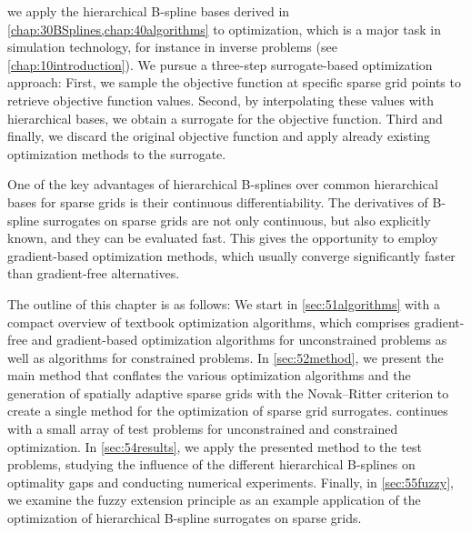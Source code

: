 
\label{chap:50optimization}

we apply the hierarchical B-spline bases derived in
\cref{chap:30BSplines,chap:40algorithms} to optimization,
which is a major task in simulation technology,
for instance in inverse problems (see \cref{chap:10introduction}).
We pursue a three-step surrogate-based optimization approach:
First, we sample the objective function at specific sparse grid points
to retrieve objective function values.
Second, by interpolating these values with hierarchical bases,
we obtain a surrogate for the objective function.
Third and finally, we discard the original objective function and apply
already existing optimization methods to the surrogate.

\vspace*{\fill}

One of the key advantages of hierarchical B-splines
over common hierarchical bases for
sparse grids is their continuous differentiability.
The derivatives of B-spline surrogates on sparse grids are not only continuous,
but also explicitly known, and they can be evaluated fast.
This gives the opportunity to employ gradient-based optimization methods,
which usually converge significantly faster than gradient-free alternatives.

\vspace*{\fill}

The outline of this chapter is as follows:
We start in \cref{sec:51algorithms}
with a compact overview of textbook optimization algorithms,
\pagebreak%
which comprises gradient-free and gradient-based optimization algorithms
for unconstrained problems as well as algorithms for constrained problems.
In \cref{sec:52method}, we present the main method that
conflates the various optimization algorithms and
the generation of spatially adaptive sparse grids with the
Novak--Ritter criterion to create a single method for the
optimization of sparse grid surrogates.
 continues with a small array of test problems
for unconstrained and constrained optimization.
In \cref{sec:54results}, we apply the presented method
to the test problems, studying the influence of the different
hierarchical B-splines on optimality gaps and conducting
numerical experiments.
Finally, in \cref{sec:55fuzzy}, we examine the fuzzy extension principle
as an example application of the optimization of
hierarchical B-spline surrogates on sparse grids.

